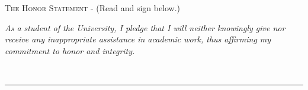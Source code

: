 \bigskip

\noindent \textsc{The Honor Statement} - (Read and sign below.)\\
\begin{footnotesize}
\textit{As a student of the University, I pledge that I will neither knowingly give nor receive any inappropriate assistance in academic work, thus affirming my commitment to honor and integrity.}\\
\end{footnotesize}

 \ \rule{8.75 cm}{.01cm}\\


\pagebreak
